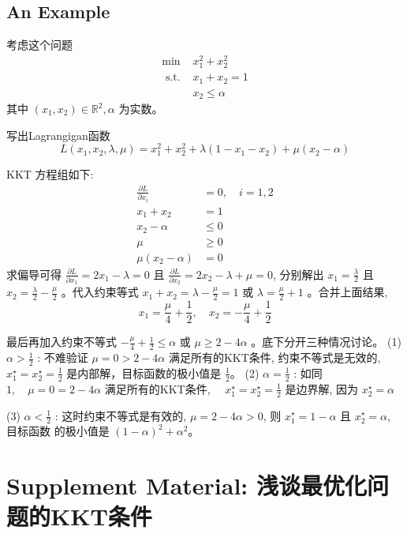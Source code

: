 \subsection{An Example}

\begin{problem}

    考虑这个问题
$$
\begin{array}{ll}
\min & x_{1}^{2}+x_{2}^{2} \\
\text { s.t. } & x_{1}+x_{2}=1 \\
& x_{2} \leq \alpha
\end{array}
$$
其中 $ \left(x_{1}, x_{2}\right) \in \mathbb{R}^{2}, \alpha $ 为实数。
\end{problem}

写出Lagrangigan函数
$$
L\left(x_{1}, x_{2}, \lambda, \mu\right)=x_{1}^{2}+x_{2}^{2}+\lambda\left(1-x_{1}-x_{2}\right)+\mu\left(x_{2}-\alpha\right)
$$

KKT 方程组如下:
$$
\begin{aligned}
\frac{\partial L}{\partial x_{i}} &=0, \quad i=1,2 \\
x_{1}+x_{2} &=1 \\
x_{2}-\alpha & \leq 0 \\
\mu & \geq 0 \\
\mu\left(x_{2}-\alpha\right) &=0
\end{aligned}
$$
求偏导可得 $ \frac{\partial L}{\partial x_{1}}=2 x_{1}-\lambda=0 $ 且 $ \frac{\partial L}{\partial x_{2}}=2 x_{2}-\lambda+\mu=0 $, 分别解出 $ x_{1}=\frac{\lambda}{2} $ 且 $ x_{2}=\frac{\lambda}{2}-\frac{\mu}{2} $ 。代入约束等式 $ x_{1}+x_{2}=\lambda-\frac{\mu}{2}=1 $ 或 $ \lambda=\frac{\mu}{2}+1 $ 。合并上面结果,
$$
x_{1}=\frac{\mu}{4}+\frac{1}{2}, \quad x_{2}=-\frac{\mu}{4}+\frac{1}{2}
$$

最后再加入约束不等式 $ -\frac{\mu}{4}+\frac{1}{2} \leq \alpha $ 或 $ \mu \geq 2-4 \alpha $ 。底下分开三种情况讨论。
(1) $ \alpha>\frac{1}{2} $ : 不难验证 $ \mu=0>2-4 \alpha $ 满足所有的KKT条件, 约束不等式是无效的, $ x_{1}^{\star}=x_{2}^{\star}=\frac{1}{2} $ 是内部解，目标函数的极小值是 $ \frac{1}{2} 。 $
(2) $ \alpha=\frac{1}{2} $ : 如同 $ 1, \quad \mu=0=2-4 \alpha $ 满足所有的KKT条件, $ \quad x_{1}^{\star}=x_{2}^{\star}=\frac{1}{2} $ 是边界解, 因为 $ x_{2}^{\star}=\alpha $

(3) $ \alpha<\frac{1}{2} $ : 这时约束不等式是有效的, $ \mu=2-4 \alpha>0 $, 则 $ x_{1}^{\star}=1-\alpha $ 且 $ x_{2}^{\star}=\alpha $, 目标函数 的极小值是 $ (1-\alpha)^{2}+\alpha^{2} 。 $

\section{Supplement Material: 浅谈最优化问题的KKT条件}

